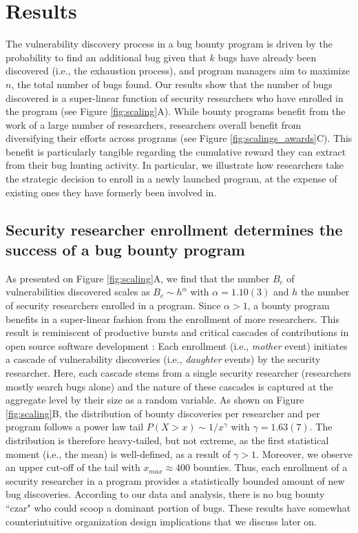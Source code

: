 \section{Results}
\label{sec:results}
The vulnerability discovery process in a bug bounty program is driven by the probability to find an additional bug given that $k$ bugs have already been discovered (i.e., the exhaustion process), and program managers aim to maximize $n$, the total number of bugs found. Our results show that the number of bugs discovered is a super-linear function of security researchers who have enrolled in the program (see Figure \ref{fig:scaling}A). While bounty programs benefit from the work of a large number of researchers, researchers overall benefit from diversifying their efforts across programs (see Figure \ref{fig:scalings_awards}C). This benefit is particularly tangible regarding the cumulative reward they can extract from their bug hunting activity. In particular, we illustrate how researchers take the strategic decision to enroll in a newly launched program, at the expense of existing ones they have formerly been involved in.
 
\subsection{Security researcher enrollment determines the success of a bug bounty program}
As presented on Figure \ref{fig:scaling}A, we find that the number $B_c$ of vulnerabilities discovered scales as $B_c \sim h^{\alpha}$ with $\alpha = 1.10(3)$ and $h$ the number of security researchers enrolled in a program. Since $\alpha > 1$, a bounty program benefits in a super-linear fashion from the enrollment of more researchers. This result is reminiscent of productive bursts and critical cascades of contributions in open source software development \cite{sornette2014much}: Each enrollment (i.e., {\it mother} event) initiates a cascade of vulnerability discoveries (i.e., {\it daughter} events) by the security researcher. Here, each cascade stems from a single security researcher (researchers mostly search bugs alone) and the nature of these cascades is captured at the aggregate level by their size as a random variable. As shown on Figure \ref{fig:scaling}B, the distribution of bounty discoveries per researcher and per program follows a power law tail $P(X>x) \sim 1/x^\gamma$  with $ \gamma = 1.63(7)$. The distribution is therefore heavy-tailed, but not extreme, as the first statistical moment (i.e., the mean) is well-defined, as a result of $ \gamma > 1$. Moreover, we observe an upper cut-off of the tail with $x_{max} \approx 400$ bounties. Thus, each enrollment of a security researcher in a program provides a statistically bounded amount of new bug discoveries. According to our data and analysis, there is no bug bounty ``czar" who could scoop a dominant portion of bugs. These results have somewhat counterintuitive organization design implications that we discuss later on.\\

